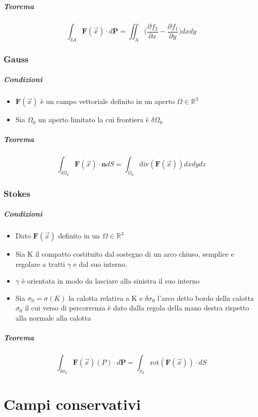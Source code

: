 \documentclass[10pt,a4paper]{report}
\newcommand{\pdv}[3]{\frac{\partial^{#2} #1}{\partial #3^{#2}}}
\begin{document}
			\subparagraph{Teorema}
			
			\[ \int_{\delta A} \mathbf{F}(\vec{x}) \cdot d \mathbf{P} = \iint_{A} \Big(\pdv{f_{2}}{}{x} - \pdv{f_{1}}{}{y}\Big) dxdy \]
			
			
			\subsubsection{Gauss}
				\subparagraph{Condizioni}
					\begin{itemize}
						\item $ \mathbf{F}(\vec{x}) $ è un campo vettoriale definito in un aperto $ \Omega \in \mathbb{R}^{3} $
						\item Sia $ \Omega_{0} $ un aperto limitato la cui frontiera è $ \delta \Omega_{0} $
					\end{itemize}
				\subparagraph{Teorema}
				\[ \int_{\delta \Omega_{0}} \mathbf{F}(\vec{x}) \cdot \mathbf{n} dS = \int_{\Omega_{0}} \textrm{div}(\mathbf{F}(\vec{x})) dxdydz \]
			
			\subsubsection{Stokes}
			
				\subparagraph{Condizioni}
				\begin{itemize}
					\item Dato $\mathbf{F}(\vec{x})$ definito in un $ \Omega \in \mathbb{R}^{3} $
					\item Sia K il compatto costituito dal sostegno di un arco chiuso, semplice e regolare a tratti $ \gamma $ e dal suo interno.
					\item $ \gamma $ è orientata in modo da lasciare alla sinistra il suo interno
					\item Sia $ \sigma_{0} = \sigma(K) $ la calotta relativa a K e $ \delta \sigma_{0} $ l'arco detto bordo della calotta $ \sigma_{0} $  il cui verso di percorrenza è dato dalla regola della mano destra  rispetto alla normale alla calotta
				\end{itemize}
				\subparagraph{Teorema}
				\[ \int_{\delta \sigma_{0}} \mathbf{F}(\vec{x})(P) \cdot d \mathbf{P} = \int_{ \sigma_{0}} \textrm{rot}(\mathbf{F}(\vec{x})) \cdot d S\]




	
	\section*{Campi conservativi}
    
\end{document}
